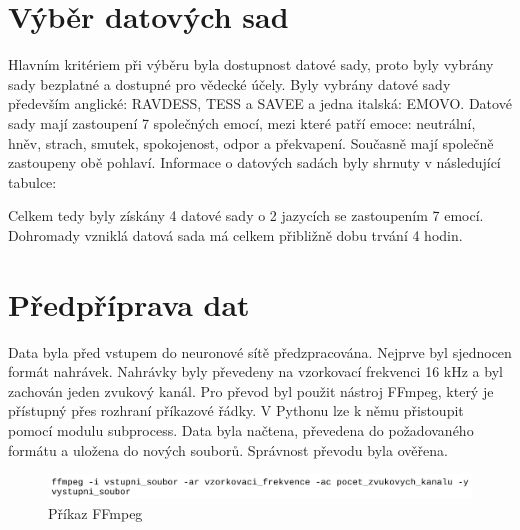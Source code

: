 \documentclass[FM,BP]{tulthesis}
\begin{document}
\section{Výběr datových sad}
Hlavním kritériem při výběru byla dostupnost datové sady, proto byly vybrány sady bezplatné a dostupné pro vědecké účely. Byly vybrány datové sady především anglické: RAVDESS, TESS a SAVEE a jedna italská: EMOVO. Datové sady mají zastoupení 7 společných emocí, mezi které patří emoce: neutrální, hněv, strach, smutek, spokojenost, odpor a překvapení. Současně mají společně zastoupeny obě pohlaví. Informace o datových sadách byly shrnuty v následující tabulce:

\begin{table}[ht]
\centering
{}
\caption{Přehled vybraných datových sad} 
\end{table} 

Celkem tedy byly získány 4 datové sady o 2 jazycích se zastoupením 7 emocí. Dohromady vzniklá datová sada má celkem přibližně dobu trvání 4 hodin.

\section{Předpříprava dat}
Data byla před vstupem do neuronové sítě předzpracována. Nejprve byl sjednocen formát nahrávek. Nahrávky byly převedeny na vzorkovací frekvenci 16 kHz a byl zachován jeden zvukový kanál. Pro převod byl použit nástroj FFmpeg, který je přístupný přes rozhraní příkazové řádky. V Pythonu lze k němu přistoupit pomocí modulu subprocess. Data byla načtena, převedena do požadovaného formátu a uložena do nových souborů. Správnost převodu byla ověřena.

\begin{figure}[htbp]
\centerline{\includegraphics[width=\textwidth,height=\textheight,keepaspectratio]{ffmpeg_command.png}}
\caption{Příkaz FFmpeg}
\label{fig}
\end{figure}
\end{document}
